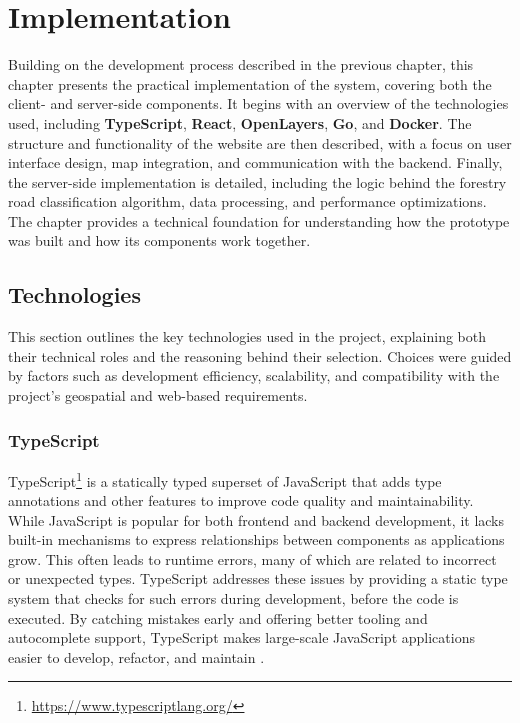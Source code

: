 \chapter{Implementation}\label{chap:implementation}

Building on the development process described in the previous chapter, this chapter presents the practical implementation of the system, covering both the client- and server-side components. It begins with an overview of the technologies used, including \textbf{TypeScript}, \textbf{React}, \textbf{OpenLayers}, \textbf{Go}, and \textbf{Docker}. The structure and functionality of the website are then described, with a focus on user interface design, map integration, and communication with the backend. Finally, the server-side implementation is detailed, including the logic behind the forestry road classification algorithm, data processing, and performance optimizations. The chapter provides a technical foundation for understanding how the prototype was built and how its components work together.


\section{Technologies}

This section outlines the key technologies used in the project, explaining both their technical roles and the reasoning behind their selection. Choices were guided by factors such as development efficiency, scalability, and compatibility with the project's geospatial and web-based requirements.

\subsection{TypeScript}

TypeScript\footnote{\url{https://www.typescriptlang.org/}} is a statically typed superset of JavaScript that adds type annotations and other features to improve code quality and maintainability. While JavaScript is popular for both frontend and backend development, it lacks built-in mechanisms to express relationships between components as applications grow. This often leads to runtime errors, many of which are related to incorrect or unexpected types. TypeScript addresses these issues by providing a static type system that checks for such errors during development, before the code is executed. By catching mistakes early and offering better tooling and autocomplete support, TypeScript makes large-scale JavaScript applications easier to develop, refactor, and maintain \cite{typescript_handbook}. 

